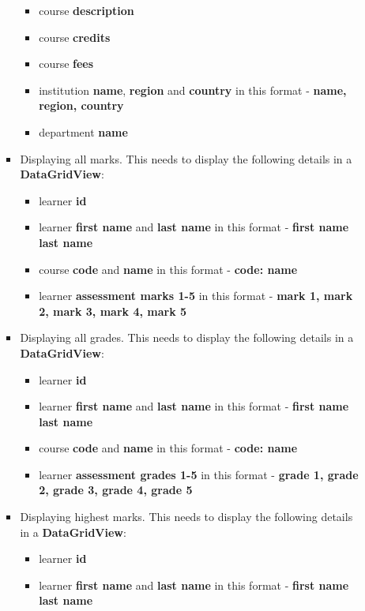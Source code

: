 \documentclass{article}
\begin{document}
\begin{itemize}
\begin{itemize}
\begin{itemize}
\begin{itemize}
                \item course \textbf{description}
                \item course \textbf{credits}
                \item course \textbf{fees}
                \item institution \textbf{name}, \textbf{region} and \textbf{country} in this format - \textbf{name, region, country}
                \item department \textbf{name}
            \end{itemize}
            \item Displaying all marks. This needs to display the following details in a \textbf{DataGridView}:
            \begin{itemize}
                \item learner \textbf{id}
                \item learner \textbf{first name} and \textbf{last name} in this format - \textbf{first name last name}
                \item course \textbf{code} and \textbf{name} in this format - \textbf{code: name}
                \item learner \textbf{assessment marks 1-5} in this format - \textbf{mark 1, mark 2, mark 3, mark 4, mark 5}
            \end{itemize}
            \item Displaying all grades. This needs to display the following details in a \textbf{DataGridView}:
            \begin{itemize}
                \item learner \textbf{id}
                \item learner \textbf{first name} and \textbf{last name} in this format - \textbf{first name last name}
                \item course \textbf{code} and \textbf{name} in this format - \textbf{code: name}
                \item learner  \textbf{assessment grades 1-5} in this format - \textbf{grade 1, grade 2, grade 3, grade 4, grade 5}
            \end{itemize}
            \item Displaying highest marks. This needs to display the following details in a \textbf{DataGridView}:
            \begin{itemize}
                \item learner \textbf{id}
                \item learner \textbf{first name} and \textbf{last name} in this format - \textbf{first name last name}

\end{itemize}
\end{itemize}
\end{itemize}
\end{itemize}
\end{document}
